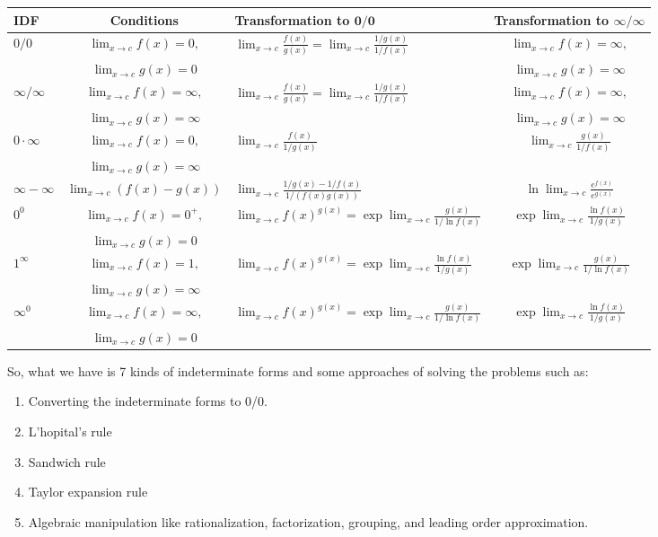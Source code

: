 \begin{table}[htbp]
\centering
\begin{tabular}{|p{1cm}|c|p{5cm}|c|}
\hline
\textbf{IDF} & \textbf{Conditions} & \textbf{Transformation to} $\boldsymbol{0/0}$ & \textbf{Transformation to} $\boldsymbol{\infty/\infty}$ \\
\hline
$0/0$ & $\lim_{x \to c} f(x) = 0,$ & $\lim_{x \to c} \frac{f(x)}{g(x)} = \lim_{x \to c} \frac{1/g(x)}{1/f(x)}$ & $\lim_{x \to c} f(x) = \infty,$ \\
& $\lim_{x \to c} g(x) = 0$ & & $\lim_{x \to c} g(x) = \infty$ \\
\hline
$\infty/\infty$ & $\lim_{x \to c} f(x) = \infty,$ & $\lim_{x \to c} \frac{f(x)}{g(x)} = \lim_{x \to c} \frac{1/g(x)}{1/f(x)}$ & $\lim_{x \to c} f(x) = \infty,$ \\
& $\lim_{x \to c} g(x) = \infty$ & & $\lim_{x \to c} g(x) = \infty$ \\
\hline
$0 \cdot \infty$ & $\lim_{x \to c} f(x) = 0,$ & $\lim_{x \to c} \frac{f(x)}{1/g(x)}$ & $\lim_{x \to c} \frac{g(x)}{1/f(x)}$ \\
& $\lim_{x \to c} g(x) = \infty$ & & \\
\hline
$\infty - \infty$ & $\lim_{x \to c} (f(x) - g(x))$ & $\lim_{x \to c} \frac{1/g(x) - 1/f(x)}{1/(f(x)g(x))}$ & $\ln \lim_{x \to c} \frac{e^{f(x)}}{e^{g(x)}}$ \\
\hline
$0^0$ & $\lim_{x \to c} f(x) = 0^+,$ & $\lim_{x \to c} f(x)^{g(x)} = \exp \lim_{x \to c} \frac{g(x)}{1/\ln f(x)}$ & $\exp \lim_{x \to c} \frac{\ln f(x)}{1/g(x)}$ \\
& $\lim_{x \to c} g(x) = 0$ & & \\
\hline
$1^\infty$ & $\lim_{x \to c} f(x) = 1,$ & $\lim_{x \to c} f(x)^{g(x)} = \exp \lim_{x \to c} \frac{\ln f(x)}{1/g(x)}$ & $\exp \lim_{x \to c} \frac{g(x)}{1/\ln f(x)}$ \\
& $\lim_{x \to c} g(x) = \infty$ & & \\
\hline
$\infty^0$ & $\lim_{x \to c} f(x) = \infty,$ & $\lim_{x \to c} f(x)^{g(x)} = \exp \lim_{x \to c} \frac{g(x)}{1/\ln f(x)}$ & $\exp \lim_{x \to c} \frac{\ln f(x)}{1/g(x)}$ \\
& $\lim_{x \to c} g(x) = 0$ & & \\
\hline
\end{tabular}
\end{table}


\begin{outline}
    So, what we have is 7 kinds of indeterminate forms and some approaches of solving the problems such as:
    \begin{enumerate}
        \item Converting the indeterminate forms to 0/0.
        \item L'hopital's rule
        \item Sandwich rule
        \item Taylor expansion rule
        \item Algebraic manipulation like rationalization, factorization, grouping, and leading order approximation.
    \end{enumerate}
\end{outline}



